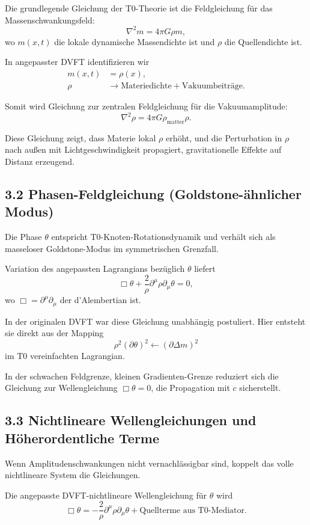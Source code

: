 	Die grundlegende Gleichung der T0-Theorie ist die Feldgleichung für das Massenschwankungsfeld:
	\[
	\nabla^2 m = 4\pi G \rho m,
	\]
	wo $m(x,t)$ die lokale dynamische Massendichte ist und $\rho$ die Quellendichte ist.
	
	In angepasster DVFT identifizieren wir
	\begin{align}
		m(x,t) &= \rho(x), \\
		\rho &\to \text{Materiedichte} + \text{Vakuumbeiträge}.
	\end{align}
	
	Somit wird Gleichung zur zentralen Feldgleichung für die Vakuumamplitude:
	\[
	\nabla^2 \rho = 4\pi G \rho_{\text{matter}} \rho.
	\]
	
	Diese Gleichung zeigt, dass Materie lokal $\rho$ erhöht, und die Perturbation in $\rho$ nach außen mit Lichtgeschwindigkeit propagiert, gravitationelle Effekte auf Distanz erzeugend.
	
	\subsection{3.2 Phasen-Feldgleichung (Goldstone-ähnlicher Modus)}
	
	Die Phase $\theta$ entspricht T0-Knoten-Rotationsdynamik und verhält sich als masseloser Goldstone-Modus im symmetrischen Grenzfall.
	
	Variation des angepassten Lagrangians bezüglich $\theta$ liefert
	\[
	\Box \theta + \frac{2}{\rho} \partial^\mu \rho \partial_\mu \theta = 0,
	\]
	wo $\Box = \partial^\mu \partial_\mu$ der d'Alembertian ist.
	
	In der originalen DVFT war diese Gleichung unabhängig postuliert. Hier entsteht sie direkt aus der Mapping
	\[
	\rho^2 (\partial \theta)^2 \leftarrow (\partial \Delta m)^2
	\]
	im T0 vereinfachten Lagrangian.
	
	In der schwachen Feldgrenze, kleinen Gradienten-Grenze reduziert sich die Gleichung zur Wellengleichung $\Box \theta = 0$, die Propagation mit $c$ sicherstellt.
	
	\subsection{3.3 Nichtlineare Wellengleichungen und Höherordentliche Terme}
	
	Wenn Amplitudenschwankungen nicht vernachlässigbar sind, koppelt das volle nichtlineare System die Gleichungen.
	
	Die angepasste DVFT-nichtlineare Wellengleichung für $\theta$ wird
	\[
	\Box \theta = -\frac{2}{\rho} \partial^\mu \rho \partial_\mu \theta + \text{Quellterme aus T0-Mediator}.
	\]
	
